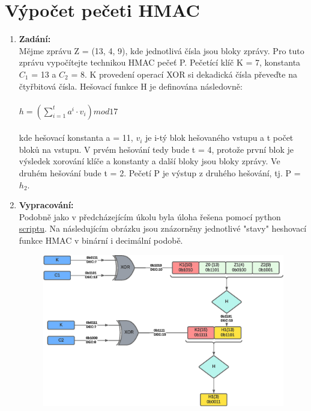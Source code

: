 \documentclass[10pt, a4paper]{article}%
\begin{document}
	\section*{\large{\textbf{Výpočet pečeti HMAC}}}
		\begin{enumerate}
			\item \textbf{Zadání:}\\
				Mějme zprávu Z = (13, 4, 9), kde jednotlivá čísla jsou bloky zprávy. Pro tuto zprávu vypočítejte
				technikou HMAC pečeť P. Pečetící klíč K = 7, konstanta $C_1$ = 13 a $C_2$ = 8. K provedení operací
				XOR si dekadická čísla převeďte na čtyřbitová čísla. Hešovací funkce H je definována následovně:\\\\
				$h = \left( \sum_{i = 1}^{t}  a^i \cdot v_i \right) mod 17$\\\\
				kde hešovací konstanta a = 11, $v_i$ je i-tý blok hešovaného vstupu a t počet bloků na vstupu. V prvém
				hešování tedy bude t = 4, protože první blok je výsledek xorování klíče a konstanty a další bloky
				jsou bloky zprávy. Ve druhém hešování bude t = 2. Pečetí P je výstup z druhého hešování, tj. P = $h_2$.
				\item \textbf{Vypracování:}\\
				Podobně jako v předcházejícím úkolu byla úloha řešena pomocí python
				\href{https://github.com/FilipPaul/ctvrtak_letni_semestr/blob/main/MKC_NSB/ukol1_kryptografie/README.md}{\color{blue} scriptu}.
				Na následujícím obrázku jsou znázorněny jednotlivé "stavy" heshovací funkce HMAC v binární i decimální podobě.
				\begin{figure}[ht!]
					\centering
					\includegraphics[width = 1\textwidth]{HMAC_drawing.eps}
				\end{figure}
		\end{enumerate}
	\clearpage
\end{document}
